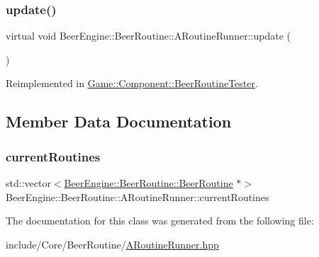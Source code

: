 \mbox{\label{class_beer_engine_1_1_beer_routine_1_1_a_routine_runner_a7a5253cb3a64dcb1aa66806fe7c12f62}} 
\subsubsection{\texorpdfstring{update()}{update()}}
{\footnotesize\ttfamily virtual void Beer\+Engine\+::\+Beer\+Routine\+::\+A\+Routine\+Runner\+::update (\begin{DoxyParamCaption}{ }\end{DoxyParamCaption})\hspace{0.3cm}{\ttfamily [virtual]}}



Reimplemented in \mbox{\hyperlink{class_game_1_1_component_1_1_beer_routine_tester_a2f14ce6211722f92a8ec5886dbeabd6c}{Game\+::\+Component\+::\+Beer\+Routine\+Tester}}.



\subsection{Member Data Documentation}
\mbox{\label{class_beer_engine_1_1_beer_routine_1_1_a_routine_runner_a529596ac2d47cd5a2efb58f93fb40ff4}} 
\subsubsection{\texorpdfstring{current\+Routines}{currentRoutines}}
{\footnotesize\ttfamily std\+::vector$<$\mbox{\hyperlink{class_beer_engine_1_1_beer_routine_1_1_beer_routine}{Beer\+Engine\+::\+Beer\+Routine\+::\+Beer\+Routine}} $\ast$$>$ Beer\+Engine\+::\+Beer\+Routine\+::\+A\+Routine\+Runner\+::current\+Routines}



The documentation for this class was generated from the following file\+:\begin{DoxyCompactItemize}
\item 
include/\+Core/\+Beer\+Routine/\mbox{\hyperlink{_a_routine_runner_8hpp}{A\+Routine\+Runner.\+hpp}}\end{DoxyCompactItemize}
